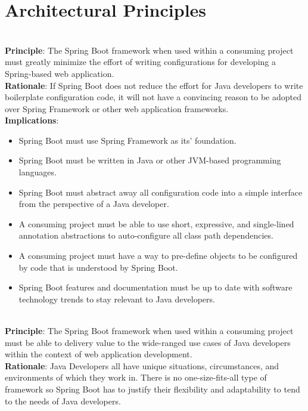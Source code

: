 \section{Architectural Principles}

\noindent\makebox[\linewidth]{\rule{\textwidth}{3pt}}\ \\

\textbf{Principle}: The Spring Boot framework when used within a consuming project must greatly minimize the effort of writing configurations for developing a Spring-based web application.\\

\textbf{Rationale}: If Spring Boot does not reduce the effort for Java developers to write boilerplate configuration code, it will not have a convincing reason to be adopted over Spring Framework or other web application frameworks.\\

\textbf{Implications}: 
\begin{itemize}
\item Spring Boot must use Spring Framework as its' foundation.
\item Spring Boot must be written in Java or other JVM-based programming languages.
\item Spring Boot must abstract away all configuration code into a simple interface from the perspective of a Java developer.
\item A consuming project must be able to use short, expressive, and single-lined annotation abstractions to auto-configure all class path dependencies.
\item A consuming project must have a way to pre-define objects to be configured by code that is understood by Spring Boot.
\item Spring Boot features and documentation must be up to date with software technology trends to stay relevant to Java developers.
\end{itemize}

\noindent\makebox[\linewidth]{\rule{\textwidth}{3pt}}\ \\

\textbf{Principle}: The Spring Boot framework when used within a consuming project must be able to delivery value to the wide-ranged use cases of Java developers within the context of web application development.\\

\textbf{Rationale}: Java Developers all have unique situations, circumstances, and environments of which they work in. There is no one-size-fits-all type of framework so Spring Boot has to justify their flexibility and adaptability to tend to the needs of Java developers.\\

